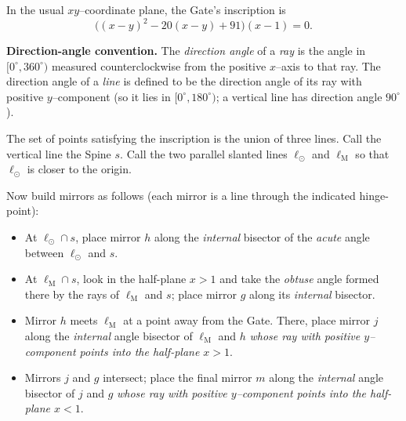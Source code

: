 
\Problem
In the usual $xy$--coordinate plane, the Gate's inscription is
\[
\bigl((x-y)^2-20(x-y)+91\bigr)(x-1)=0.
\]

\textbf{Direction-angle convention.}
The \emph{direction angle} of a \emph{ray} is the angle in $[0^\circ,360^\circ)$ measured counterclockwise from the positive $x$--axis to that ray.
The direction angle of a \emph{line} is defined to be the direction angle of its ray with positive $y$--component (so it lies in $[0^\circ,180^\circ)$; a vertical line has direction angle $90^\circ$).

The set of points satisfying the inscription is the union of three lines.
Call the vertical line the \textsf{Spine} $s$.
Call the two parallel slanted lines $\ell_{\odot}$ and $\ell_{\mathrm{M}}$ so that $\ell_{\odot}$ is closer to the origin.

Now build mirrors as follows (each mirror is a line through the indicated hinge-point):
\begin{itemize}[leftmargin=1.2em]
\item At $\ell_{\odot}\cap s$, place mirror $h$ along the \emph{internal} bisector of the \emph{acute} angle between $\ell_{\odot}$ and $s$.
\item At $\ell_{\mathrm{M}}\cap s$, look in the half-plane $x>1$ and take the \emph{obtuse} angle formed there by the rays of $\ell_{\mathrm{M}}$ and $s$; place mirror $g$ along its \emph{internal} bisector.
\item Mirror $h$ meets $\ell_{\mathrm{M}}$ at a point away from the Gate. There, place mirror $j$ along the \emph{internal} angle bisector of $\ell_{\mathrm{M}}$ and $h$ \emph{whose ray with positive $y$--component points into the half-plane $x>1$}.
\item Mirrors $j$ and $g$ intersect; place the final mirror $m$ along the \emph{internal} angle bisector of $j$ and $g$ \emph{whose ray with positive $y$--component points into the half-plane $x<1$}.
\end{itemize}

